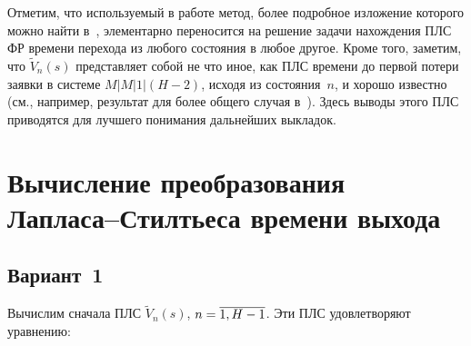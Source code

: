 \begin{multicols}{2}
Отметим, что используемый в работе метод, более подробное изложение
которого можно найти в~\cite{36-pe}, элементарно переносится на решение
задачи нахождения ПЛС ФР времени перехода из любого состояния в
любое другое. Кроме того, заметим, что $\tilde{V}_n(s)$ представляет
собой не что иное, как ПЛС времени до первой потери заявки в системе
$M|M|1|(H-2)$, исходя из состояния~$n$, и хорошо известно (см.,
например, результат для более общего случая в~\cite{37-pe}). Здесь
выводы этого ПЛС приводятся для лучшего понимания дальнейших
выкладок.

\vspace*{-4pt}


\section{Вычисление преобразования Лапласа--Стилтьеса времени выхода}

\vspace*{-3pt}

\subsection{Вариант~1}

\vspace*{-2pt}


Вычислим сначала ПЛС $\tilde{V}_n(s)$, $n\hm=\overline{1,H-1}$. Эти ПЛС
удовлетворяют уравнению:


\end{multicols}
